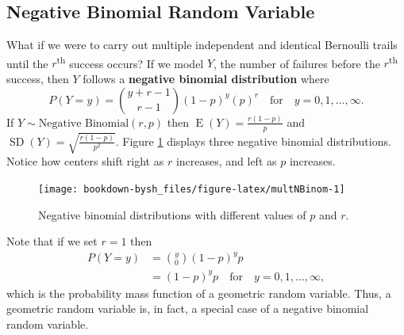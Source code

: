 \documentclass[
]{krantz}
\newcommand{\E}{\operatorname{E}}
\newcommand{\SD}{\operatorname{SD}}
\begin{document}
\hypertarget{negative-binomial-random-variable}{%
\subsection{Negative Binomial Random Variable}\label{negative-binomial-random-variable}}

What if we were to carry out multiple independent and identical Bernoulli trails until the \(r\)\textsuperscript{th} success occurs?
If we model \(Y\), the number of failures before the \(r\)\textsuperscript{th} success, then \(Y\) follows a \textbf{negative binomial distribution} where
\begin{equation}
P(Y=y) = \binom{y + r - 1}{r-1} (1-p)^{y}(p)^r \quad \textrm{for}\quad y = 0, 1, \ldots, \infty.
\label{eq:nBinomRV}
\end{equation}
If \(Y \sim \textrm{Negative Binomial}(r, p)\) then \(\E(Y) = \frac{r(1-p)}{p}\) and \(\SD(Y) = \sqrt{\frac{r(1-p)}{p^2}}\). Figure \ref{fig:multNBinom} displays three negative binomial distributions. Notice how centers shift right as \(r\) increases, and left as \(p\) increases.



\begin{figure}

{\centering \texttt{[image: bookdown-bysh\_files/figure-latex/multNBinom-1]} 

}

\caption{Negative binomial distributions with different values of \(p\) and \(r\).}\label{fig:multNBinom}
\end{figure}

Note that if we set \(r=1\) then
\begin{align*}
 P(Y=y) &= \binom{y}{0} (1-p)^yp \\
        &= (1-p)^yp \quad \textrm{for} \quad y = 0, 1, \ldots, \infty,
\end{align*}
which is the probability mass function of a geometric random variable. Thus, a geometric random variable is, in fact, a special case of a negative binomial random variable.
\end{document}
